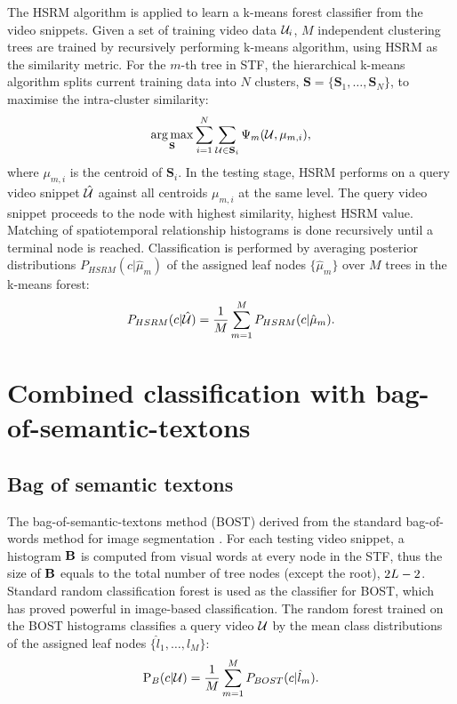 The HSRM algorithm is applied to learn a k-means forest classifier from the video snippets. Given a set of training video data $\mathcal{U}_i$, $M$ independent clustering trees are trained by recursively performing k-means algorithm, using HSRM as the similarity metric. 
For the $m$-th tree in STF, the hierarchical k-means algorithm splits current training data into $N$ clusters, $\mathbf{S} = \{\mathbf{S}_1,\dots,\mathbf{S}_N\}$, to maximise the intra-cluster similarity:
\begin{equation}
	\displaystyle\operatorname*{arg\,max}_{\mathbf{S}} \displaystyle\sum_{i = 1}^{N}\sum_{\mathcal{U} \in \mathbf{S}_{i}} \Psi_m(\mathcal{U}, \mu_{m,i}),
	\label{eqn/act/kmeans}
\end{equation}
where $\mu_{m,i}$ is the centroid of $\mathbf{S}_i$. In the testing stage, HSRM performs on a query video snippet $\mathcal{\hat{U}}$ against all centroids $\mu_{m,i}$ at the same level. The query video snippet proceeds to the node with highest similarity, \ie highest HSRM value. Matching of spatiotemporal relationship histograms is done recursively until a terminal node is reached. Classification is performed by averaging posterior distributions $P_{HSRM}(c|\hat{\mu}_{m})$ of the assigned leaf nodes $\{ \hat{\mu}_m \}$ over $M$ trees in the k-means forest: 
\begin{equation}
	P_{HSRM}(c|\mathcal{\hat{U}}) = 
	\frac{1}{M}\displaystyle\sum_{m=1}^{M}P_{HSRM}(c|\hat{\mu}_{m}).
	\label{eqn/act/kmeansforest}
\end{equation}

\section{Combined classification with bag-of-semantic-textons}
\label{sec/act/combine}

\subsection{Bag of semantic textons}
The bag-of-semantic-textons method (BOST) derived from the standard bag-of-words method for image segmentation \cite{Shotton2008}. For each testing video snippet, a histogram $\mathbf{B}$ is computed from visual words at every node in the STF, thus the size of $\mathbf{B}$ equals to the total number of tree nodes (except the root), \ie $2L - 2$.  
Standard random classification forest \cite{Breiman2001} is used as the classifier for BOST, which has proved powerful in image-based classification. 
The random forest trained on the BOST histograms classifies a query video $\mathcal{U}$ by the mean class distributions of the assigned leaf nodes $\{\hat{l}_1,\dots,\hat{l}_{M}\}$:
\begin{equation}
\mathrm{P}_{B}(c|\mathcal{U}) = \frac{1}{M}\displaystyle\sum_{m=1}^{M}P_{BOST}(c|\hat{l}_m).
\label{eqn/act/bost}
\end{equation}

